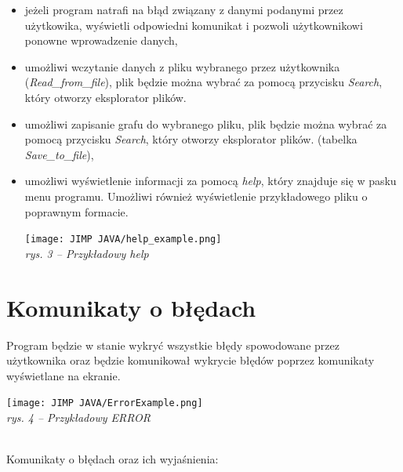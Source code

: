 \documentclass[12pt, a4paper]{article}
\begin{document}
\begin{itemize}
    \item jeżeli program natrafi na błąd związany z danymi podanymi przez użytkowika, wyświetli odpowiedni komunikat i pozwoli użytkownikowi ponowne wprowadzenie danych,
    \item umożliwi wczytanie danych z pliku wybranego przez użytkownika (\textit{Read\_from\_file}), plik będzie można wybrać za pomocą przycisku \textit{Search}, który otworzy eksplorator plików.
    \item umożliwi zapisanie grafu do wybranego pliku, plik będzie można wybrać za pomocą przycisku \textit{Search}, który otworzy eksplorator plików. (tabelka \textit{Save\_to\_file}),
    \item umożliwi wyświetlenie informacji za pomocą \textit{help}, który znajduje się w pasku menu programu. Umożliwi również wyświetlenie przykładowego pliku o poprawnym formacie.
    
    \begin{center}
    \texttt{[image: JIMP JAVA/help\_example.png]}\\
    \caption{\textit{rys. 3 -- Przykładowy help} \label{overflow}}
    \end{center}
    
    
\end{itemize}


\section*{Komunikaty o błędach}

Program będzie w stanie wykryć wszystkie błędy spowodowane przez użytkownika oraz będzie komunikował wykrycie błędów poprzez komunikaty wyświetlane na ekranie.

\begin{center}
\texttt{[image: JIMP JAVA/ErrorExample.png]}\\
\caption{\textit{rys. 4 -- Przykładowy ERROR} \label{overflow}}
\end{center}

\\Komunikaty o błędach oraz ich wyjaśnienia:
\end{document}
